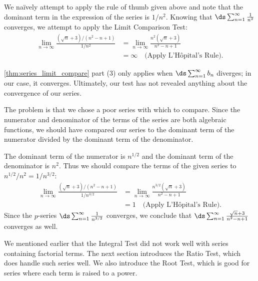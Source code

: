 {We na\"ively attempt to apply the rule of thumb given above and note that the dominant term in the expression of the series is $1/n^2$. Knowing that $\ds \sum_{n=1}^\infty \frac1{n^2}$ converges, we attempt to apply the Limit Comparison Test:
\begin{align*}
	\lim_{n\to\infty}\frac{(\sqrt{n}+3)/(n^2-n+1)}{1/n^2}
	&=\lim_{n\to\infty}\frac{n^2(\sqrt n+3)}{n^2-n+1}\\
	&= \infty \quad \text{(Apply L'H\^opital's Rule)}.
\end{align*}

\autoref{thm:series_limit_compare} part (3) only applies when $\ds\sum_{n=1}^\infty b_n$ diverges; in our case, it converges. Ultimately, our test has not revealed anything about the convergence of our series.

The problem is that we chose a poor series with which to compare. Since the numerator and denominator of the terms of the series are both algebraic functions, we should have compared our series  to the dominant term of the numerator divided by the dominant term of the denominator.

The dominant term of the numerator is $n^{1/2}$ and the dominant term of the denominator is $n^2$. Thus we should compare the terms of the given series to $n^{1/2}/n^2 = 1/n^{3/2}$:
\begin{align*}
\lim_{n\to\infty}\frac{(\sqrt{n}+3)/(n^2-n+1)}{1/n^{3/2}} &= \lim_{n\to \infty} \frac{n^{3/2}(\sqrt n+3)}{n^2-n+1} \\
		&= 1\quad \text{(Apply L'H\^opital's Rule)}.
\end{align*}
Since the  $p$-series $\ds\sum_{n=1}^\infty \frac1{n^{3/2}}$ converges, we conclude that $\ds\sum_{n=1}^\infty \frac{\sqrt{n}+3}{n^2-n+1}$ converges as well.}

We mentioned earlier that the Integral Test did not work well with series containing factorial terms. The next section introduces the Ratio Test, which does handle such series well. We also introduce the Root Test, which is good for series where each term is raised to a power.





